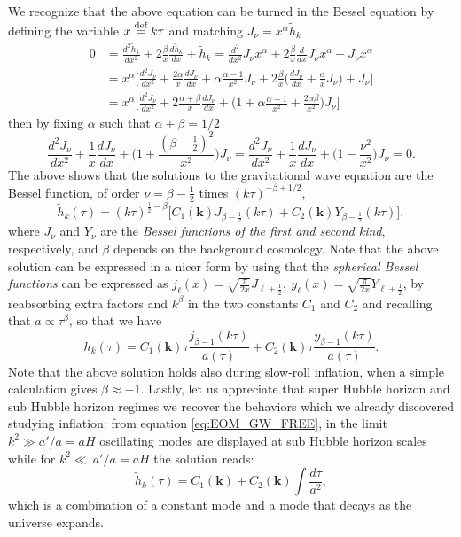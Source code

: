 We recognize that the above equation can be turned in the Bessel equation by defining the variable $x\stackrel{\text{def}}{=} k\tau$ and matching $J_\nu=x^\alpha\tilde h_k$
\begin{align*}
    0&=\frac{d^2\tilde h_k}{dx^2}+2\frac{\beta}{x}\frac{d\tilde h_k}{dx}+\tilde h_k=\frac{d^2}{dx^2}J_\nu x^\alpha+2\frac{\beta}{x}\frac{d}{dx}J_\nu x^\alpha+J_\nu x^\alpha\\ &=x^\alpha\bigg[\frac{d^2J_\nu}{dx^2}+\frac{2\alpha}{x}\frac{dJ_\nu}{dx}+\alpha\frac{\alpha-1}{x^2}J_\nu+2\frac{\beta}{x}\bigg(\frac{dJ_\nu}{dx}+\frac{\alpha}{x}J_\nu\bigg)+J_\nu\bigg]\\
    &=x^\alpha\bigg[\frac{d^2J_\nu}{dx^2}+2\frac{\alpha+\beta}{x}\frac{dJ_\nu}{dx}+\bigg(1+\alpha\frac{\alpha-1}{x^2}+\frac{2\alpha\beta}{x^2}\bigg)J_\nu\bigg]
\end{align*}
then by fixing $\alpha$ such that $\alpha+\beta=1/2$ 
$$\frac{d^2J_\nu}{dx^2}+\frac{1}{x}\frac{dJ_\nu}{dx}+\bigg(1+\frac{(\beta-\frac{1}{2})^2}{x^2}\bigg)J_\nu=\frac{d^2J_\nu}{dx^2}+\frac{1}{x}\frac{dJ_\nu}{dx}+\bigg(1-\frac{\nu^2}{x^2}\bigg)J_\nu=0.$$
The above shows that the solutions to the gravitational wave equation are the Bessel function, of order $\nu=\beta-\tfrac12$ times $(k\tau)^{-\beta+1/2}$,
$$\tilde h_k(\tau)=(k\tau)^{\frac{1}{2}-\beta}\bigg[C_1(\mathbf{k}) J_{\beta-\frac{1}{2}}(k\tau)+C_2(\mathbf{k}) Y_{\beta-\frac{1}{2}}(k\tau)\bigg],$$
where $J_\nu$ and $Y_\nu$ are the \emph{Bessel functions of the first and second kind}, respectively, and $\beta$ depends on the background cosmology. Note that the above solution can be expressed in a nicer form by using that the \emph{spherical Bessel functions} can be expressed as $j_\ell(x)=\sqrt{\frac{\pi}{2x}}J_{\ell+\frac{1}{2}},\ y_\ell(x)=\sqrt{\frac{\pi}{2x}}Y_{\ell+\frac{1}{2}}$, by reabsorbing extra factors and $k^{\beta}$ in the two constants $C_1$ and $C_2$ and recalling that $a\propto\tau^{\beta}$, so that we have
\begin{equation}
    \label{eq:free_GW_sol}
    \tilde h_k(\tau)=C_1(\mathbf{k})\tau\frac{j_{\beta-1}(k\tau)}{a(\tau)}+C_2(\mathbf{k})\tau\frac{y_{\beta-1}(k\tau)}{a(\tau)}.
\end{equation}
Note that the above solution holds also during slow-roll inflation, when a simple calculation gives $\beta\approx-1$. Lastly, let us appreciate that super Hubble horizon and sub Hubble horizon regimes we recover the behaviors which we already discovered studying inflation: from equation \eqref{eq:EOM_GW_FREE}, in the limit $k^2\gg a'/a=a H$ oscillating modes are displayed at sub Hubble horizon scales while for $k^2\ll\ a'/a=a H$ the solution reads:
$$\tilde h_k(\tau)=C_1(\mathbf k)+C_2(\mathbf k)\int\frac{d\tau}{a^2},$$ which is a combination of a constant mode and a mode that decays as the universe expands.
